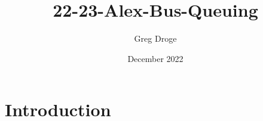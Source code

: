 \documentclass{article}
\title{22-23-Alex-Bus-Queuing}
\author{Greg Droge}
\date{December 2022}
\begin{document}
\maketitle

\section{Introduction}
\end{document}
